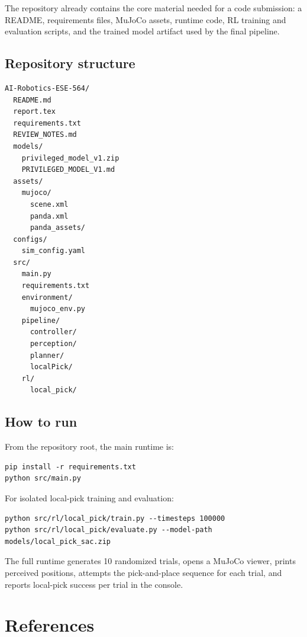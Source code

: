 \documentclass[11pt]{article}
\begin{document}
The repository already contains the core material needed for a code submission: a README, requirements files, MuJoCo assets, runtime code, RL training and evaluation scripts, and the trained model artifact used by the final pipeline.

\subsection{Repository structure}

\begin{verbatim}
AI-Robotics-ESE-564/
  README.md
  report.tex
  requirements.txt
  REVIEW_NOTES.md
  models/
    privileged_model_v1.zip
    PRIVILEGED_MODEL_V1.md
  assets/
    mujoco/
      scene.xml
      panda.xml
      panda_assets/
  configs/
    sim_config.yaml
  src/
    main.py
    requirements.txt
    environment/
      mujoco_env.py
    pipeline/
      controller/
      perception/
      planner/
      localPick/
    rl/
      local_pick/
\end{verbatim}

\subsection{How to run}

From the repository root, the main runtime is:

\begin{verbatim}
pip install -r requirements.txt
python src/main.py
\end{verbatim}

For isolated local-pick training and evaluation:

\begin{verbatim}
python src/rl/local_pick/train.py --timesteps 100000
python src/rl/local_pick/evaluate.py --model-path models/local_pick_sac.zip
\end{verbatim}

The full runtime generates 10 randomized trials, opens a MuJoCo viewer, prints perceived positions, attempts the pick-and-place sequence for each trial, and reports local-pick success per trial in the console.

\section*{References}
\end{document}
